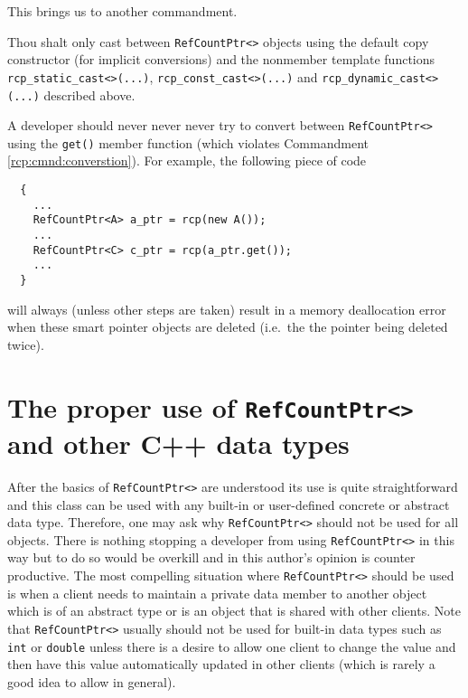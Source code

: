 This brings us to another commandment.

\begin{commandment}\label{rcp:cmnd:converstion}
Thou shalt only cast between {}\texttt{RefCountPtr<>} objects using the
default copy constructor (for implicit conversions) and the nonmember
template functions {}\texttt{rcp\-\_static\-\_cast<>(...)},
{}\texttt{rcp\-\_const\-\_cast<>(...)} and
{}\texttt{rcp\-\_dynamic\-\_cast<>(...)}  described above.
\end{commandment}

A developer should never never never try to convert between
{}\texttt{RefCountPtr<>} using the {}\texttt{get()} member function
(which violates Commandment {}\ref{rcp:cmnd:converstion}).  For
example, the following piece of code

{\scriptsize\begin{verbatim}
  {
    ...
    RefCountPtr<A> a_ptr = rcp(new A());
    ...
    RefCountPtr<C> c_ptr = rcp(a_ptr.get());
    ...
  }
\end{verbatim}}

{}\noindent{} will always (unless other steps are taken) result in a
memory deallocation error when these smart pointer objects are deleted
(i.e.~the the pointer being deleted twice).

%
\section{The proper use of {}\texttt{RefCountPtr<>} and other C++ data types}
%

After the basics of {}\texttt{RefCountPtr<>} are understood its use is
quite straightforward and this class can be used with any built-in or
user-defined concrete or abstract data type.  Therefore, one may ask
why {}\texttt{RefCountPtr<>} should not be used for all objects.
There is nothing stopping a developer from using
{}\texttt{RefCountPtr<>} in this way but to do so would be overkill
and in this author's opinion is counter productive.  The most
compelling situation where {}\texttt{RefCountPtr<>} should be used is
when a client needs to maintain a private data member to another
object which is of an abstract type or is an object that is shared
with other clients.  Note that {}\texttt{RefCountPtr<>} usually should
not be used for built-in data types such as {}\texttt{int} or
{}\texttt{double} unless there is a desire to allow one client to
change the value and then have this value automatically updated in
other clients (which is rarely a good idea to allow in general).

